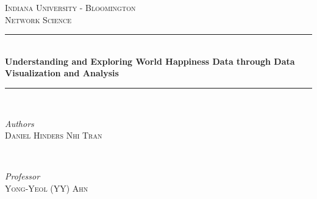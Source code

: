 \documentclass[11pt,twocolumn]{article}
\begin{document}
\begin{titlepage} %
    \newcommand{\HRule}{\rule{\linewidth}{0.5mm}} %
    
    \center %
    
    
    \textsc{\LARGE Indiana University - Bloomington}\\[1.5cm] %
    
    \textsc{\Large Network Science}\\[0.5cm] %
        
    
    \HRule\\[0.4cm]
    
    {\huge\bfseries Understanding and Exploring World Happiness Data through Data Visualization and Analysis}\\[0.4cm] %
    
    \HRule\\[1.5cm]
    
    
    \begin{minipage}{0.4\textwidth}
        \begin{flushleft}
            \large
            \textit{Authors}\\
            \textsc{Daniel Hinders\newline} %
            \textsc{Nhi Tran} %

        \end{flushleft}


    \end{minipage}
    ~
    \begin{minipage}{0.4\textwidth}
        \begin{flushright}
            \large
            \textit{Professor}\\
            \textsc{Yong-Yeol (YY) Ahn} %
        \end{flushright}
    \end{minipage}
    

\end{titlepage}
\end{document}
